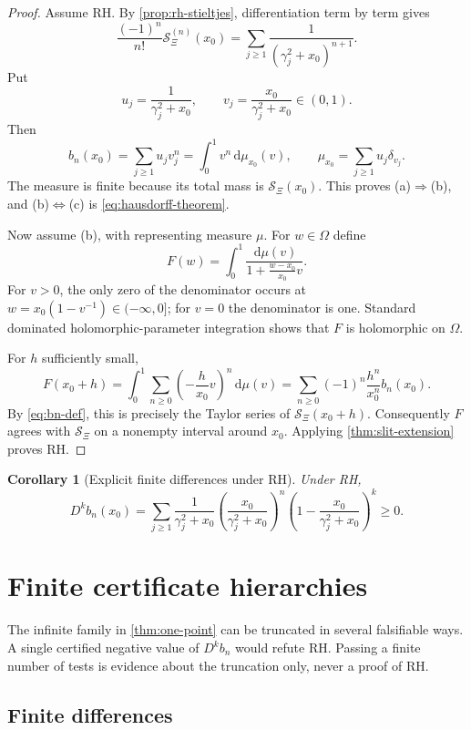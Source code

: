\documentclass[11pt]{article}
\newtheorem{corollary}[theorem]{Corollary}
\theoremstyle{definition}
\newcommand{\XiR}{\mathcal S_{\Xi}}
\newcommand{\dd}{\,\mathrm d}
\begin{document}
\begin{proof}
Assume RH. By \cref{prop:rh-stieltjes}, differentiation term by term gives
\[
 \frac{(-1)^n}{n!}\XiR^{(n)}(x_0)
 =\sum_{j\ge1}\frac{1}{(\gamma_j^2+x_0)^{n+1}}.
\]
Put
\[
 u_j=\frac{1}{\gamma_j^2+x_0},
 \qquad
 v_j=\frac{x_0}{\gamma_j^2+x_0}\in(0,1).
\]
Then
\[
 b_n(x_0)=\sum_{j\ge1}u_jv_j^n
 =\int_0^1 v^n\dd\mu_{x_0}(v),
 \qquad
 \mu_{x_0}=\sum_{j\ge1}u_j\delta_{v_j}.
\]
The measure is finite because its total mass is $\XiR(x_0)$. This proves (a)$\Rightarrow$(b),
and (b)$\Leftrightarrow$(c) is \eqref{eq:hausdorff-theorem}.

Now assume (b), with representing measure $\mu$. For $w\in\Omega$ define
\begin{equation}\label{eq:hausdorff-extension}
 F(w)=\int_0^1
 \frac{\dd\mu(v)}{1+\frac{w-x_0}{x_0}v}.
\end{equation}
For $v>0$, the only zero of the denominator occurs at
$w=x_0(1-v^{-1})\in(-\infty,0]$; for $v=0$ the denominator is one. Standard dominated
holomorphic-parameter integration shows that $F$ is holomorphic on $\Omega$.

For $h$ sufficiently small,
\[
 F(x_0+h)
 =\int_0^1\sum_{n\ge0}\left(-\frac{h}{x_0}v\right)^n\dd\mu(v)
 =\sum_{n\ge0}(-1)^n\frac{h^n}{x_0^n}b_n(x_0).
\]
By \eqref{eq:bn-def}, this is precisely the Taylor series of $\XiR(x_0+h)$.
Consequently $F$ agrees with $\XiR$ on a nonempty interval around $x_0$. Applying
\cref{thm:slit-extension} proves RH.
\end{proof}

\begin{corollary}[Explicit finite differences under RH]\label{cor:diff-spectral}
Under RH,
\[
 D^k b_n(x_0)
 =\sum_{j\ge1}
 \frac{1}{\gamma_j^2+x_0}
 \left(\frac{x_0}{\gamma_j^2+x_0}\right)^n
 \left(1-\frac{x_0}{\gamma_j^2+x_0}\right)^k
 \ge0.
\]
\end{corollary}

\section{Finite certificate hierarchies}

The infinite family in \cref{thm:one-point} can be truncated in several falsifiable ways.
A single certified negative value of $D^kb_n$ would refute RH. Passing a finite number of
tests is evidence about the truncation only, never a proof of RH.

\subsection{Finite differences}
\end{document}
